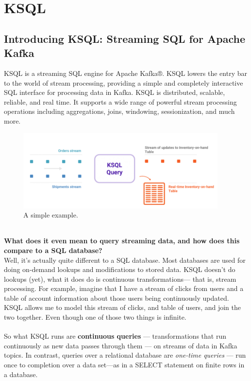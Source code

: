 \documentclass[10pt,a4paper]{article}
\newcommand{\nline}{\\~\\}
\begin{document}
\section{KSQL}
\subsection{Introducing KSQL: Streaming SQL for Apache Kafka}
KSQL is a streaming SQL engine for Apache Kafka®. KSQL lowers the entry bar to the world of stream processing, providing a simple and completely interactive SQL interface for processing data in Kafka. KSQL is distributed, scalable, reliable, and real time. It supports a wide range of powerful stream processing operations including aggregations, joins, windowing, sessionization, and much more.
\begin{figure}[ht!]
 \hfill \includegraphics[width=300pt]{images/ksql-example}\hspace*{\fill}
 \caption{A simple example.}
 \end{figure} \\
\textbf{What does it even mean to query streaming data, and how does this compare to a SQL database?} \\
Well, it’s actually quite different to a SQL database. Most databases are used for doing on-demand lookups and modifications to stored data. KSQL doesn’t do lookups (yet), what it does do is continuous transformations— that is, stream processing. For example, imagine that I have a stream of clicks from users and a table of account information about those users being continuously updated. KSQL allows me to model this stream of clicks, and table of users, and join the two together. Even though one of those two things is infinite.
\nline
So what KSQL runs are \textbf{continuous queries} — transformations that run continuously as new data passes through them — on streams of data in Kafka topics. In contrast, queries over a relational database are \textit{one-time queries} — run once to completion over a data set—as in a SELECT statement on finite rows in a database.
 
\end{document}
